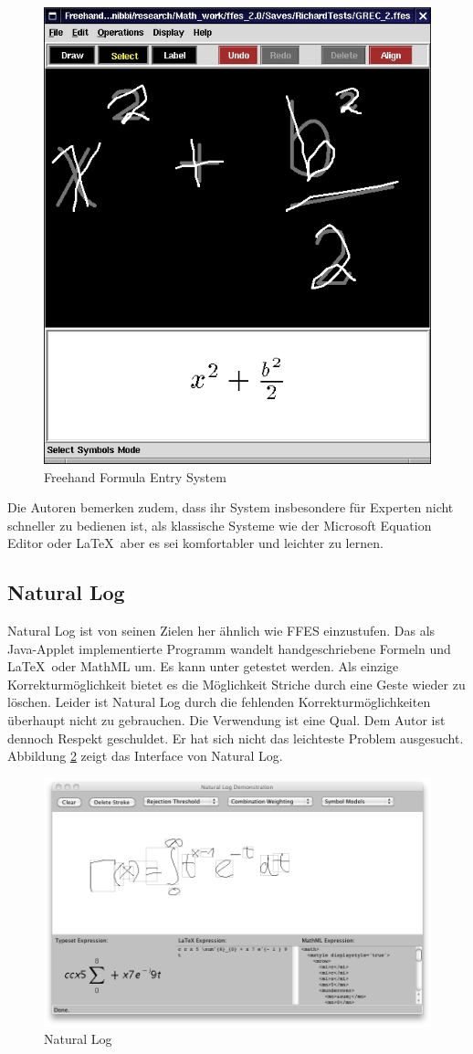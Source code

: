 \begin{figure}[htbp]
  \begin{center}
    \includegraphics[width=.5\textwidth]{figures/ffes.png}
  \end{center}
  \caption{Freehand Formula Entry System}
  \label{fig:ffes}
\end{figure}

Die Autoren bemerken zudem, dass ihr System insbesondere für Experten nicht schneller zu bedienen ist, als klassische Systeme wie der Microsoft Equation Editor oder \LaTeX~aber es sei komfortabler und leichter zu lernen.

\subsection{Natural Log}
\label{sub:natural-log}

Natural Log ist von seinen Zielen her ähnlich wie FFES einzustufen. Das als Java-Applet implementierte Programm wandelt handgeschriebene Formeln und \LaTeX~oder MathML um. Es kann unter \cite{natural-log} getestet werden. Als einzige Korrekturmöglichkeit bietet es die Möglichkeit Striche durch eine Geste wieder zu löschen. Leider ist Natural Log durch die fehlenden Korrekturmöglichkeiten überhaupt nicht zu gebrauchen. Die Verwendung ist eine Qual. Dem Autor \citet{Matasakis:1999p9465} ist dennoch Respekt geschuldet. Er hat sich nicht das leichteste Problem ausgesucht. Abbildung \ref{fig:natural-log} zeigt das Interface von Natural Log.

\begin{figure}[htbp]
  \begin{center}
    \includegraphics[width=.8\textwidth]{figures/natural-log.png}
  \end{center}
  \caption{Natural Log}
  \label{fig:natural-log}
\end{figure}

